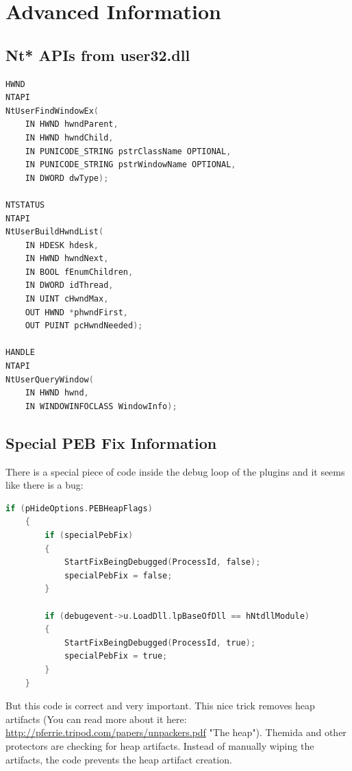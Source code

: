 \documentclass[10pt,a4paper]{article}
\begin{document}
\section{Advanced Information}
\subsection{Nt* APIs from user32.dll}

\begin{lstlisting}[language=C, caption=Special Nt* APIs declaration]
HWND
NTAPI
NtUserFindWindowEx(
    IN HWND hwndParent,
    IN HWND hwndChild,
    IN PUNICODE_STRING pstrClassName OPTIONAL,
    IN PUNICODE_STRING pstrWindowName OPTIONAL,
    IN DWORD dwType);

NTSTATUS
NTAPI
NtUserBuildHwndList(
    IN HDESK hdesk,
    IN HWND hwndNext,
    IN BOOL fEnumChildren,
    IN DWORD idThread,
    IN UINT cHwndMax,
    OUT HWND *phwndFirst,
    OUT PUINT pcHwndNeeded);

HANDLE
NTAPI
NtUserQueryWindow(
    IN HWND hwnd,
    IN WINDOWINFOCLASS WindowInfo);

\end{lstlisting}

\subsection{Special PEB Fix Information}

There is a special piece of code inside the debug loop of the plugins and it seems like there is a bug:
\begin{lstlisting}[language=C, caption=Special PEB Fix Code]
    if (pHideOptions.PEBHeapFlags)
    {
        if (specialPebFix)
        {
            StartFixBeingDebugged(ProcessId, false);
            specialPebFix = false;
        }

        if (debugevent->u.LoadDll.lpBaseOfDll == hNtdllModule)
        {
            StartFixBeingDebugged(ProcessId, true);
            specialPebFix = true;
        }
    }
\end{lstlisting}
But this code is correct and very important. This nice trick removes heap artifacts (You can read more about it here: \url{http://pferrie.tripod.com/papers/unpackers.pdf} "The heap"). Themida and other protectors are checking for heap artifacts. Instead of manually wiping the artifacts, the code prevents the heap artifact creation.
\end{document}
